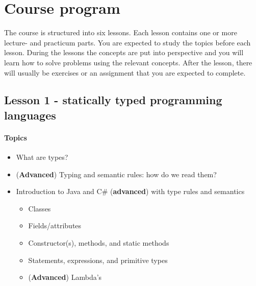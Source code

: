 \section{Course program}
	The course is structured into six lessons.
	Each lesson contains one or more lecture- and practicum parts.
	You are expected to study the topics before each lesson.
	During the lessons the concepts are put into perspective and you will learn how to solve problems using the relevant concepts.
	After the lesson, there will usually be \glspl{exercise} or an \gls{assignment} that you are expected to complete.


    \subsection{Lesson 1 - statically typed programming languages}
        \paragraph*{Topics}
            \begin{itemize}
                \item What are types?
                \item (\textbf{Advanced}) Typing and semantic rules: how do we read them?
                \item Introduction to Java and C\# (\textbf{advanced}) with type rules and semantics
                \begin{itemize}
                    \item Classes
                    \item Fields/attributes
                    \item Constructor(s), methods, and static methods
                    \item Statements, expressions, and primitive types
                    \item (\textbf{Advanced}) Lambda's
                \end{itemize}
            \end{itemize}


